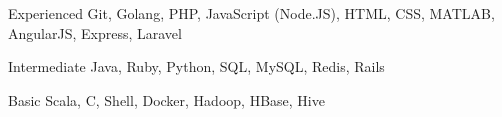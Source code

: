 

\begin{cvskills}

  \cvskill
    {Experienced} %
    {Git, Golang, PHP, JavaScript (Node.JS), HTML, CSS, MATLAB, AngularJS, Express, Laravel} %

  \cvskill
    {Intermediate} %
    {Java, Ruby, Python, SQL, MySQL, Redis, Rails} %

  \cvskill
    {Basic} %
    {Scala, C, Shell, Docker, Hadoop, HBase, Hive} %
\end{cvskills}
